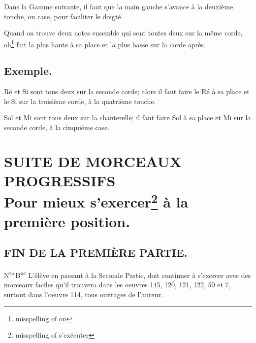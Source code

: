 \documentclass[a4paper]{book}
\begin{document}
Dans la Gamme suivante, il faut que la main gauche s'avance à la deuxième touche, ou case, pour faciliter le doigté.

Quand on trouve deux notes ensemble qui sont toutes deux sur la même corde, oh\footnote{misspelling of on} fait la plus haute à sa place et la plus basse sur la corde après.

\section*{Exemple.}

Ré et Si sont tous deux sur la seconde corde; alors il faut faire le Ré à sa place et le Si sur la troisième corde, à la quatrième touche.

Sol et Mi sont tous deux sur la chanterelle; il faut faire Sol à sa place et Mi sur la seconde corde, à la cinquième case.

\chapter[Suite de morceaux progressifs pour mieux s'exercer]{%
  SUITE DE MORCEAUX PROGRESSIFS\\
  \normalsize Pour mieux s'exercer\footnote{misspelling of s'exécuter} à la première position.}

\section*{FIN DE LA PREMIÈRE PARTIE.}

N\textsuperscript{ta}\,B\textsuperscript{ne}
L'élève en passant à la Seconde Partie, doit continuer à s'exercer avec des morceaux faciles qu'il trouvera dans les oeuvres 145, 120, 121, 122, 50 et 7, surtout dans l'oeuvre 114, tous ouvrages de l'auteur.
\end{document}
